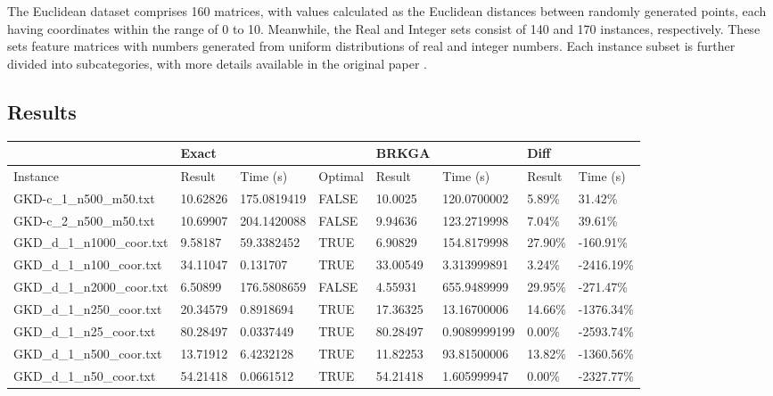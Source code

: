 \documentclass[preprint,12pt]{elsarticle}
\begin{document}
The Euclidean dataset comprises 160 matrices, with values calculated as the Euclidean distances between randomly generated points, each having coordinates within the range of 0 to 10. Meanwhile, the Real and Integer sets consist of 140 and 170 instances, respectively. These sets feature matrices with numbers generated from uniform distributions of real and integer numbers. Each instance subset is further divided into subcategories, with more details available in the original paper \cite{marti2021mdplib}.
\subsection{Results}

\begin{landscape}
\begin{table}[!ht]
    \centering
    \begin{tabular}{|l|l|l|l|l|l|l|l|}
    \hline
        ~ & Exact & ~ & ~ & BRKGA & ~ & Diff & ~ \\ \hline
        Instance & Result & Time (s) & Optimal & Result & Time (s) & Result & Time (s) \\ \hline
        GKD-c\_1\_n500\_m50.txt & 10.62826 & 175.0819419 & FALSE & 10.0025 & 120.0700002 & 5.89\% & 31.42\% \\ \hline
        GKD-c\_2\_n500\_m50.txt & 10.69907 & 204.1420088 & FALSE & 9.94636 & 123.2719998 & 7.04\% & 39.61\% \\ \hline
        GKD\_d\_1\_n1000\_coor.txt & 9.58187 & 59.3382452 & TRUE & 6.90829 & 154.8179998 & 27.90\% & -160.91\% \\ \hline
        GKD\_d\_1\_n100\_coor.txt & 34.11047 & 0.131707 & TRUE & 33.00549 & 3.313999891 & 3.24\% & -2416.19\% \\ \hline
        GKD\_d\_1\_n2000\_coor.txt & 6.50899 & 176.5808659 & FALSE & 4.55931 & 655.9489999 & 29.95\% & -271.47\% \\ \hline
        GKD\_d\_1\_n250\_coor.txt & 20.34579 & 0.8918694 & TRUE & 17.36325 & 13.16700006 & 14.66\% & -1376.34\% \\ \hline
        GKD\_d\_1\_n25\_coor.txt & 80.28497 & 0.0337449 & TRUE & 80.28497 & 0.9089999199 & 0.00\% & -2593.74\% \\ \hline
        GKD\_d\_1\_n500\_coor.txt & 13.71912 & 6.4232128 & TRUE & 11.82253 & 93.81500006 & 13.82\% & -1360.56\% \\ \hline
        GKD\_d\_1\_n50\_coor.txt & 54.21418 & 0.0661512 & TRUE & 54.21418 & 1.605999947 & 0.00\% & -2327.77\% \\ \hline

\end{tabular}
\end{table}
\end{landscape}
\end{document}
